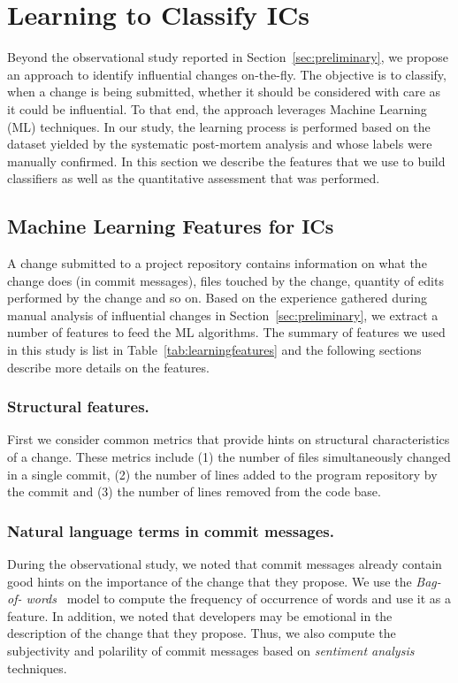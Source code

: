 \section{Learning to Classify IC{\scriptsize s}}
\label{sec:model}

Beyond the observational study reported in Section~\ref{sec:preliminary}, we
propose an approach to identify influential changes on-the-fly. The objective
is to classify, when a change is being submitted, whether it should be
considered with care as it could be influential. To that end, the approach
leverages Machine Learning (ML) techniques. In our study, the learning process
is performed based on the dataset yielded by the systematic post-mortem
analysis and whose labels were manually confirmed. In this section we describe
the features that we use to build classifiers as well as the quantitative
assessment that was performed.

\subsection{Machine Learning Features for ICs}

A change submitted to a project repository contains information on what the
change does (in commit messages), files touched by the change, quantity of
edits performed by the change and so on. Based on the experience gathered
during manual analysis of influential changes in
Section~\ref{sec:preliminary}, we extract a number of features to feed the ML
algorithms. The summary of features we used in this study is list in Table~\ref{tab:learningfeatures} and the following sections describe more details on the features.




\subsubsection{Structural features.}
First we consider common metrics that provide hints on structural
characteristics of a change.
These metrics include (1) the number of files simultaneously changed in a single
commit, (2) the number of lines added to the program repository by the 
commit and (3) the number of lines removed from the code base.


\subsubsection{Natural language terms in commit messages.} During the
observational study, we noted that commit messages already contain good hints
on the importance of the change that they propose. We use the {\em Bag-of-
words}~\cite{lewis:ecml:1998} model to compute the frequency of occurrence of
words and use it as a feature. In addition, we noted that developers may be
emotional in the description of the change that they propose. Thus, we also
compute the subjectivity and polarility of commit messages based on {\em
sentiment analysis}~\cite{hu_opinion_2006,ohana_opinion_2009,
liu_sentiment_2010,thelwall_sentiment_2010} techniques.

